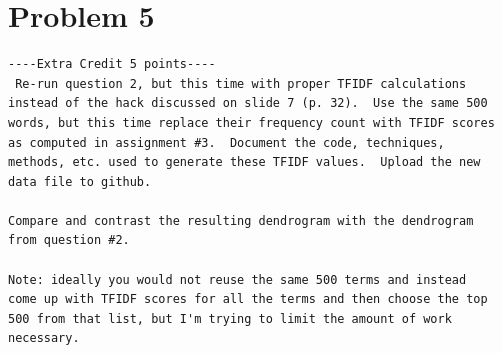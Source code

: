 
\section{Problem 5}
\label{part5}
\begin{verbatim}
----Extra Credit 5 points----
 Re-run question 2, but this time with proper TFIDF calculations
instead of the hack discussed on slide 7 (p. 32).  Use the same 500
words, but this time replace their frequency count with TFIDF scores
as computed in assignment #3.  Document the code, techniques,
methods, etc. used to generate these TFIDF values.  Upload the new
data file to github.

Compare and contrast the resulting dendrogram with the dendrogram
from question #2.

Note: ideally you would not reuse the same 500 terms and instead
come up with TFIDF scores for all the terms and then choose the top
500 from that list, but I'm trying to limit the amount of work
necessary.
\end{verbatim}

